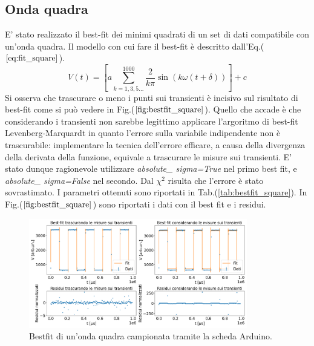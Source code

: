 \documentclass{article}
\begin{document}
    \subsection{Onda quadra}
            E' stato realizzato il best-fit dei minimi quadrati
            di un set di dati compatibile con un'onda quadra.
            Il modello con cui fare il best-fit è descritto dall'Eq.($\ref{eq:fit_square}$).
                \begin{equation}
                    V(t) = \left[a\sum_{k=1,3,5...}^{1000} \frac{2}{k\pi}\sin\left(k\omega (t+\delta)\right)\right] +c
                    \label{eq:fit_square}
                \end{equation}
            Si osserva che trascurare o meno i punti sui transienti è incisivo
            sul risultato di best-fit come si può vedere in Fig.($\ref{fig:bestfit_square}$).
            Quello che accade è che considerando i transienti non sarebbe legittimo
            applicare l'argoritmo di best-fit Levenberg-Marquardt in quanto l'errore 
            sulla variabile indipendente non è trascurabile: implementare la  tecnica 
            dell'errore efficare, a causa della divergenza della derivata della funzione, equivale
            a trascurare le misure sui transienti.
            E' stato dunque ragionevole utilizzare \emph{absolute\_ sigma=True}
            nel primo best fit, e \emph{absolute\_ sigma=False} nel secondo.
            Dal $\chi^2$ risulta che l'errore è stato sovrastimato. 
            I parametri ottenuti sono riportati in Tab.(\ref{tab:bestfit_square}).
            In Fig.($\ref{fig:bestfit_square}$) sono riportati i dati con il best fit e 
            i residui.
            

            \begin{figure}[H]
                \centering
                \includegraphics[width=0.85\textwidth]{bestfit_squarewave.png} %
                \caption{Bestfit di un'onda quadra campionata tramite la scheda Arduino.}
                \label{fig:bestfit_square}
            \end{figure}     
            
\end{document}
